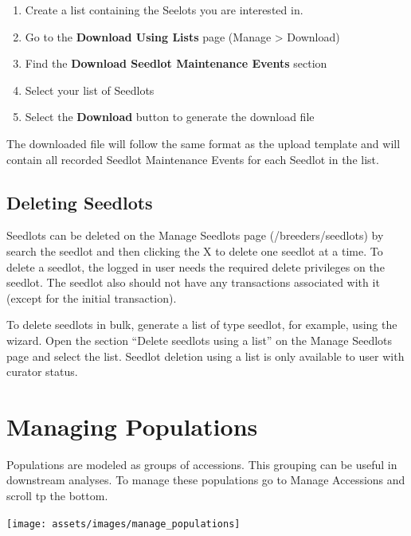\documentclass[
  12pt,
]{book}
\providecommand{\tightlist}{%
  \setlength{\itemsep}{0pt}\setlength{\parskip}{0pt}}
\begin{document}
\begin{enumerate}
\def\labelenumi{\arabic{enumi}.}
\tightlist
\item
  Create a list containing the Seelots you are interested in.
\item
  Go to the \textbf{Download Using Lists} page (Manage \textgreater{} Download)
\item
  Find the \textbf{Download Seedlot Maintenance Events} section
\item
  Select your list of Seedlots
\item
  Select the \textbf{Download} button to generate the download file
\end{enumerate}

The downloaded file will follow the same format as the upload template and will contain all recorded Seedlot Maintenance Events for each Seedlot in the list.

\hypertarget{deleting-seedlots}{%
\section{Deleting Seedlots}\label{deleting-seedlots}}

Seedlots can be deleted on the Manage Seedlots page (/breeders/seedlots) by search the seedlot and then clicking the X to delete one seedlot at a time. To delete a seedlot, the logged in user needs the required delete privileges on the seedlot. The seedlot also should not have any transactions associated with it (except for the initial transaction).

To delete seedlots in bulk, generate a list of type seedlot, for example, using the wizard. Open the section ``Delete seedlots using a list'' on the Manage Seedlots page and select the list. Seedlot deletion using a list is only available to user with curator status.

\hypertarget{managing-populations}{%
\chapter{Managing Populations}\label{managing-populations}}

Populations are modeled as groups of accessions. This grouping can be useful in downstream analyses. To manage these populations go to Manage Accessions and scroll tp the bottom.

\begin{center}\texttt{[image: assets/images/manage\_populations]} \end{center}
\end{document}
